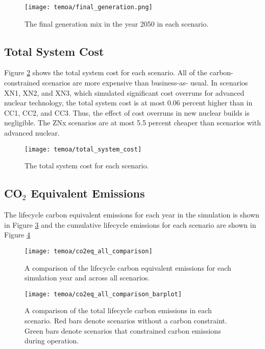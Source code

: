 \begin{figure}[htbp!]
        \begin{center}
                \texttt{[image: temoa/final\_generation.png]}
        \end{center}
        \caption{The final generation mix in the year 2050 in each scenario.}
        \label{fig:final_generation}
\end{figure}

\subsection{Total System Cost}
Figure \ref{fig:system-cost} shows the total system cost for each scenario.
All of the carbon-constrained scenarios are more expensive than business-as-
usual. In scenarios XN1, XN2, and XN3, which simulated significant cost overruns
for advanced nuclear technology, the total system cost is at most 0.06 percent
higher than in CC1, CC2, and CC3. Thus, the effect of cost overruns in new
nuclear builds is negligible. The ZNx scenarios are at most 5.5 percent cheaper
than scenarios with advanced nuclear. 

\begin{figure}[H]
  \centering
  \texttt{[image: temoa/total\_system\_cost]}
  \caption{The total system cost for each scenario.}
  \label{fig:system-cost}
\end{figure}

\subsection{CO$_2$ Equivalent Emissions}

The lifecycle carbon equivalent emissions for each year in the simulation is
shown in Figure \ref{fig:co2eq-all} and the cumulative lifecycle emissions
for each scenario are shown in Figure \ref{fig:co2eq-cumulative}

\begin{figure}[H]
  \texttt{[image: temoa/co2eq\_all\_comparison]}
  \caption{A comparison of the lifecycle carbon equivalent emissions for
  each simulation year and across all scenarios.}
  \label{fig:co2eq-all}
\end{figure}

\begin{figure}[H]
  \texttt{[image: temoa/co2eq\_all\_comparison\_barplot]}
  \caption{A comparison of the total lifecycle carbon emissions in each
  scenario. Red bars denote scenarios without a carbon constraint. Green bars
  denote scenarios that constrained carbon emissions during operation.}
  \label{fig:co2eq-cumulative}
\end{figure}


